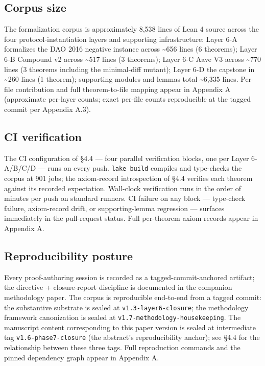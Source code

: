 \subsection{Corpus size}\label{corpus-size}

The formalization corpus is approximately 8,538 lines of Lean 4 source
across the four protocol-instantiation layers and supporting
infrastructure: Layer 6-A formalizes the DAO 2016 negative instance
across \textasciitilde656 lines (6 theorems); Layer 6-B Compound v2
across \textasciitilde517 lines (3 theorems); Layer 6-C Aave V3 across
\textasciitilde770 lines (3 theorems including the minimal-diff mutant);
Layer 6-D the capstone in \textasciitilde260 lines (1 theorem);
supporting modules and lemmas total \textasciitilde6,335 lines. Per-file
contribution and full theorem-to-file mapping appear in Appendix A
(approximate per-layer counts; exact per-file counts reproducible at the
tagged commit per Appendix A.3).

\subsection{CI verification}\label{ci-verification}

The CI configuration of §4.4 --- four parallel verification blocks, one
per Layer 6-A/B/C/D --- runs on every push. \texttt{lake\ build}
compiles and type-checks the corpus at 901 jobs; the axiom-record
introspection of §4.4 verifies each theorem against its recorded
expectation. Wall-clock verification runs in the order of minutes per
push on standard runners. CI failure on any block --- type-check
failure, axiom-record drift, or supporting-lemma regression --- surfaces
immediately in the pull-request status. Full per-theorem axiom records
appear in Appendix A.

\subsection{Reproducibility posture}\label{reproducibility-posture}

Every proof-authoring session is recorded as a tagged-commit-anchored
artifact; the directive + closure-report discipline is documented in the
companion methodology paper. The corpus is reproducible end-to-end from
a tagged commit: the substantive substrate is sealed at
\texttt{v1.3-layer6-closure}; the methodology framework canonization is
sealed at \texttt{v1.7-methodology-housekeeping}. The manuscript content
corresponding to this paper version is sealed at intermediate tag
\texttt{v1.6-phase7-closure} (the abstract's reproducibility anchor);
see §4.4 for the relationship between these three tags. Full
reproduction commands and the pinned dependency graph appear in Appendix
A.

